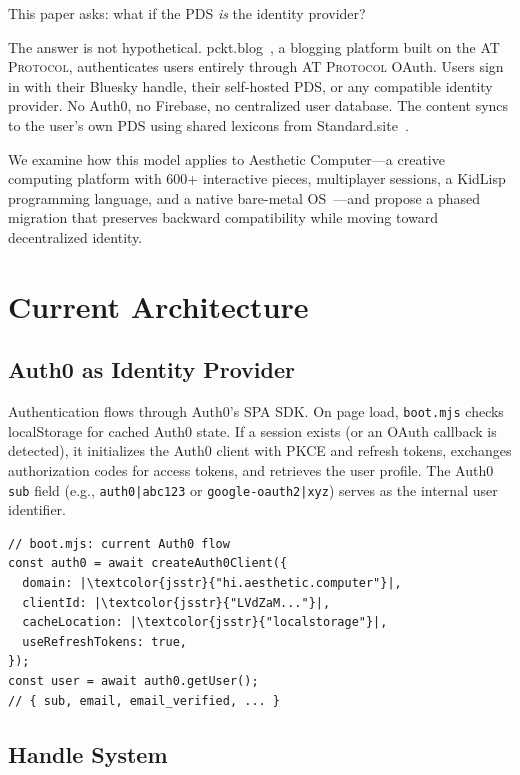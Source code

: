 \documentclass[10pt,letterpaper,twocolumn]{article}
\newcommand{\atproto}{\textsc{AT Protocol}}
\begin{document}
This paper asks: what if the PDS \emph{is} the identity provider?

The answer is not hypothetical. pckt.blog~\citep{pcktblog2025}, a blogging platform built on the \atproto{}, authenticates users entirely through \atproto{} OAuth. Users sign in with their Bluesky handle, their self-hosted PDS, or any compatible identity provider. No Auth0, no Firebase, no centralized user database. The content syncs to the user's own PDS using shared lexicons from Standard.site~\citep{standardsite2025}.

We examine how this model applies to Aesthetic Computer---a creative computing platform with 600+ interactive pieces, multiplayer sessions, a KidLisp programming language, and a native bare-metal OS~\citep{scudder2026os}---and propose a phased migration that preserves backward compatibility while moving toward decentralized identity.


\section{Current Architecture}
\label{sec:current}

\subsection{Auth0 as Identity Provider}

Authentication flows through Auth0's SPA SDK. On page load, \texttt{boot.mjs} checks localStorage for cached Auth0 state. If a session exists (or an OAuth callback is detected), it initializes the Auth0 client with PKCE and refresh tokens, exchanges authorization codes for access tokens, and retrieves the user profile. The Auth0 \texttt{sub} field (e.g., \texttt{auth0|abc123} or \texttt{google-oauth2|xyz}) serves as the internal user identifier.

\begin{lstlisting}[style=acjsstyle]
// boot.mjs: current Auth0 flow
const auth0 = await createAuth0Client({
  domain: |\textcolor{jsstr}{"hi.aesthetic.computer"}|,
  clientId: |\textcolor{jsstr}{"LVdZaM..."}|,
  cacheLocation: |\textcolor{jsstr}{"localstorage"}|,
  useRefreshTokens: true,
});
const user = await auth0.getUser();
// { sub, email, email_verified, ... }
\end{lstlisting}

\subsection{Handle System}
\end{document}
